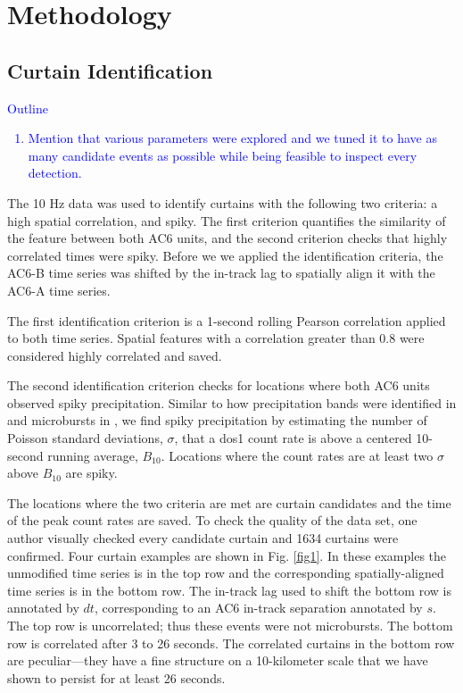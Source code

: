 \documentclass[draft]{agujournal2019}
\begin{document}
\section{Methodology} 
\subsection{Curtain Identification} \label{curtain_identification}
\textcolor{blue}{
Outline
\begin{enumerate}
\item Mention that various parameters were explored and we tuned it to have as many candidate events as possible while being feasible to inspect every detection. 
\end{enumerate}
}

The 10 Hz data was used to identify curtains with the following two criteria: a high spatial correlation, and spiky. The first criterion quantifies the similarity of the feature between both AC6 units, and the second criterion checks that highly correlated times were spiky. Before we we applied the identification criteria, the AC6-B time series was shifted by the in-track lag to spatially align it with the AC6-A time series. 

The first identification criterion is a 1-second rolling Pearson correlation applied to both time series. Spatial features with a correlation greater than 0.8 were considered highly correlated and saved.

The second identification criterion checks for locations where both AC6 units observed spiky precipitation. Similar to how precipitation bands were identified in  and microbursts in , we find spiky precipitation by estimating the number of Poisson standard deviations, $\sigma$, that a dos1 count rate is above a centered 10-second running average, $B_{10}$. Locations where the count rates are at least two $\sigma$ above $B_{10}$ are spiky. 

The locations where the two criteria are met are curtain candidates and the time of the peak count rates are saved. To check the quality of the data set, one author visually checked every candidate curtain and 1634 curtains were confirmed. Four curtain examples are shown in Fig. \ref{fig1}. In these examples the unmodified time series is in the top row and the corresponding spatially-aligned time series is in the bottom row. The in-track lag used to shift the bottom row is annotated by $dt$, corresponding to an AC6 in-track separation annotated by $s$. The top row is uncorrelated; thus these events were not microbursts. The bottom row is correlated after 3 to 26 seconds. The correlated curtains in the bottom row are peculiar---they have a fine structure on a 10-kilometer scale that we have shown to persist for at least 26 seconds.
\end{document}
